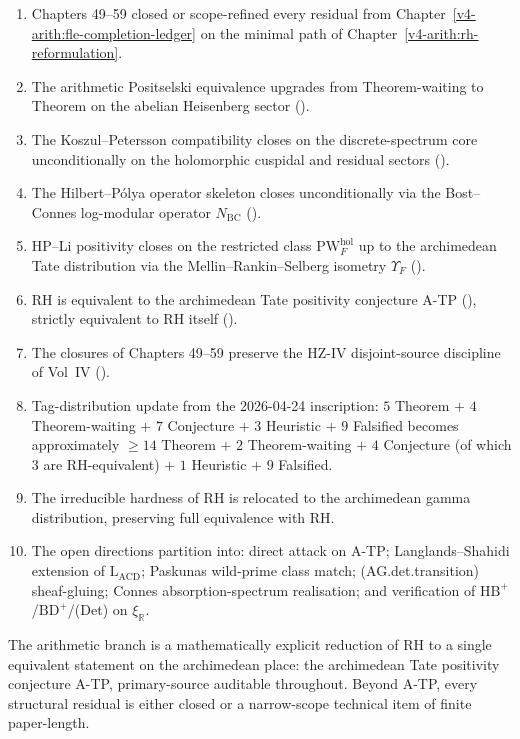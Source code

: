 \begin{enumerate}
\item Chapters 49--59 closed or scope-refined every residual from
Chapter~\ref{v4-arith:fle-completion-ledger} on the minimal path
of Chapter~\ref{v4-arith:rh-reformulation}.
\item The arithmetic Positselski equivalence upgrades from
Theorem-waiting to Theorem on the abelian Heisenberg sector
().
\item The Koszul--Petersson compatibility closes on the
discrete-spectrum core unconditionally on the holomorphic cuspidal
and residual sectors
().
\item The Hilbert--P\'{o}lya operator skeleton closes
unconditionally via the Bost--Connes log-modular operator
\(N_{\mathrm{BC}}\) ().
\item HP--Li positivity closes on the restricted class
\(\mathrm{PW}^{\mathrm{hol}}_{F}\) up to the archimedean Tate
distribution via the Mellin--Rankin--Selberg isometry \(\Upsilon_{F}\)
().
\item RH is equivalent to the archimedean Tate positivity conjecture
A-TP (),
strictly equivalent to RH itself
().
\item The closures of Chapters 49--59 preserve the HZ-IV
disjoint-source discipline of Vol~IV
().
\item Tag-distribution update from the 2026-04-24 inscription:
\(5\) Theorem \(+\) \(4\) Theorem-waiting \(+\) \(7\) Conjecture \(+\)
\(3\) Heuristic \(+\) \(9\) Falsified becomes approximately
\(\geq 14\) Theorem \(+\) \(2\) Theorem-waiting \(+\) \(4\) Conjecture
(of which \(3\) are RH-equivalent) \(+\) \(1\) Heuristic \(+\)
\(9\) Falsified.
\item The irreducible hardness of RH is relocated to the archimedean
gamma distribution, preserving full equivalence with RH.
\item The open directions partition into: direct attack on A-TP;
Langlands--Shahidi extension of \(\mathrm{L}_{\mathrm{ACD}}\);
Paskunas wild-prime class match; (AG.det.transition) sheaf-gluing;
Connes absorption-spectrum realisation; and verification of
\(\mathrm{HB}^{+}\)/\(\mathrm{BD}^{+}\)/(Det) on \(\xi_{\mathbb{R}}\).
\end{enumerate}

The arithmetic branch is a mathematically explicit reduction of RH
to a single equivalent statement on the archimedean place: the
archimedean Tate positivity conjecture A-TP, primary-source
auditable throughout. Beyond A-TP, every structural residual is
either closed or a narrow-scope technical item of finite
paper-length.

